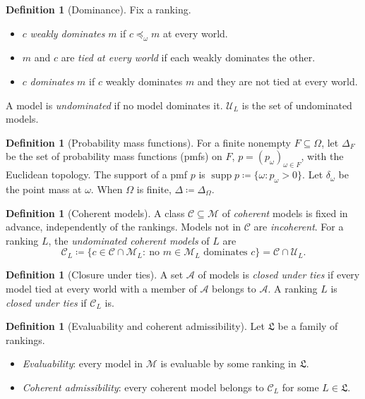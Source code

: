 \documentclass[11pt]{article}
\theoremstyle{definition}
\newtheorem{definition}[theorem]{Definition}
\theoremstyle{remark}
\newcommand{\M}{\mathcal M}
\newcommand{\C}{\mathcal C}
\newcommand{\U}{\mathcal U}
\newcommand{\Lf}{\mathfrak L}
\newcommand{\supp}{\operatorname{supp}}
\begin{document}
\begin{definition}[Dominance]\label{def:dominance}
Fix a ranking.
\begin{itemize}[leftmargin=*]
\item $c$ \emph{weakly dominates} $m$ if $c\preceq_\omega m$ at every world.
\item $m$ and $c$ are \emph{tied at every world} if each weakly dominates the other.
\item $c$ \emph{dominates} $m$ if $c$ weakly dominates $m$ and they are not tied at every world.
\end{itemize}
A model is \emph{undominated} if no model dominates it. $\U_L$ is the set of undominated models.
\end{definition}

\begin{definition}[Probability mass functions]\label{def:priors}
For a finite nonempty $F\subseteq\Omega$, let $\Delta_F$ be the set of probability mass functions (pmfs) on $F$, $p=(p_\omega)_{\omega\in F}$, with the Euclidean topology. The support of a pmf $p$ is $\supp p\coloneqq\{\omega:p_\omega>0\}$. Let $\delta_\omega$ be the point mass at $\omega$. When $\Omega$ is finite, $\Delta\coloneqq\Delta_\Omega$.
\end{definition}

\begin{definition}[Coherent models]\label{def:coherence-property}
A class $\C\subseteq\M$ of \emph{coherent} models is fixed in advance, independently of the rankings. Models not in $\C$ are \emph{incoherent}. For a ranking $L$, the \emph{undominated coherent models} of $L$ are
\[
\C_L\coloneqq\{c\in\C\cap\M_L:\ \text{no } m\in\M_L \text{ dominates } c\}=\C\cap\U_L.
\]
\end{definition}

\begin{definition}[Closure under ties]\label{def:tie-closure}
A set $\mathcal A$ of models is \emph{closed under ties} if every model tied at every world with a member of $\mathcal A$ belongs to $\mathcal A$. A ranking $L$ is \emph{closed under ties} if $\C_L$ is.
\end{definition}

\begin{definition}[Evaluability and coherent admissibility]\label{def:family-assumptions}
Let $\Lf$ be a family of rankings.
\begin{itemize}[leftmargin=*]
\item \emph{Evaluability}: every model in $\M$ is evaluable by some ranking in $\Lf$.
\item \emph{Coherent admissibility}: every coherent model belongs to $\C_L$ for some $L\in\Lf$.
\end{itemize}
\end{definition}
\end{document}
